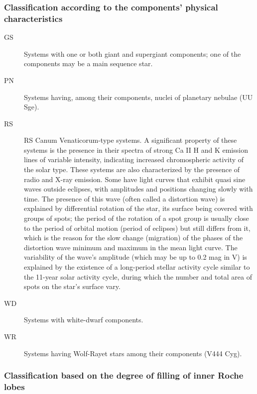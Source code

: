 \subsubsection{Classification according to the components' physical characteristics}
\label{classification-according-to-the-components-physical-characteristics}

\begin{description}
\item[GS]     Systems with one or both giant and supergiant components;
              one of the components may be a main sequence star.
\item[PN]     Systems having, among their components, nuclei of planetary nebulae (UU Sge).
\item[RS]     RS Canum Venaticorum-type systems. A significant property
              of these systems is the presence in their spectra of strong Ca II H and
              K emission lines of variable intensity, indicating increased
              chromospheric activity of the solar type. These systems are also
              characterized by the presence of radio and X-ray emission. Some have
              light curves that exhibit quasi sine waves outside eclipses, with
              amplitudes and positions changing slowly with time. The presence of this
              wave (often called a distortion wave) is explained by differential
              rotation of the star, its surface being covered with groups of spots;
              the period of the rotation of a spot group is usually close to the
              period of orbital motion (period of eclipses) but still differs from it,
              which is the reason for the slow change (migration) of the phases of the
              distortion wave minimum and maximum in the mean light curve. The
              variability of the wave's amplitude (which may be up to 0.2 mag in V) is
              explained by the existence of a long-period stellar activity cycle
              similar to the 11-year solar activity cycle, during which the number and
              total area of spots on the star's surface vary.
\item[WD]     Systems with white-dwarf components.
\item[WR]     Systems having Wolf-Rayet stars among their components (V444 Cyg).
\end{description}

\subsubsection{Classification based on the degree of filling of inner Roche lobes}
\label{classification-based-on-the-degree-of-filling-of-inner-roche-lobes}

